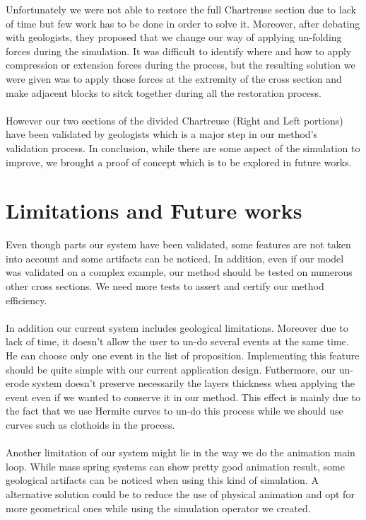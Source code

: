 \documentclass[12pt, a4paper]{report} %
\begin{document}
 Unfortunately we were not able to restore the full Chartreuse section due to lack of time but few work has to be done in order to solve it. Moreover, after debating with geologists, they proposed that we change our way of applying un-folding forces during the simulation. It was difficult to identify where and how to apply compression or extension forces during the process, but the resulting solution we were given was to apply those forces at the extremity of the cross section and make adjacent blocks to sitck together during all the restoration process.\\\\
 However our two sections of the divided Chartreuse (Right and Left portions) have been validated by geologists which is a major step in our method's validation process. In conclusion, while there are some aspect of the simulation  to  improve, we brought a proof of concept which is to be explored in future works.
\chapter{Limitations and Future works}

Even though parts our system have been validated, some features are not taken into account and some artifacts can be noticed. In addition, even if our model was validated on a complex example, our method should be tested on numerous other cross sections. We need more tests to assert and certify our method efficiency.
\\\\
In addition our current system includes geological limitations. Moreover due to lack of time, it doesn't allow the user to un-do several events at the same time. He can choose only one event in the list of proposition. Implementing this feature should be quite simple with our current application design.
Futhermore, our un-erode system doesn't preserve necessarily the layers thickness when applying the event even if we wanted to conserve it in our method. This effect is mainly due to the fact that we use Hermite curves to un-do this process while we should use curves such as clothoids in the process.
\\\\
Another limitation of our system might lie in the way we do the animation main loop. While mass spring systems can show pretty good animation result, some geological artifacts can be noticed when using this kind of simulation. A alternative solution could be to reduce the use of physical animation and opt for more geometrical ones while using the simulation operator we created.\\\\
\end{document}
